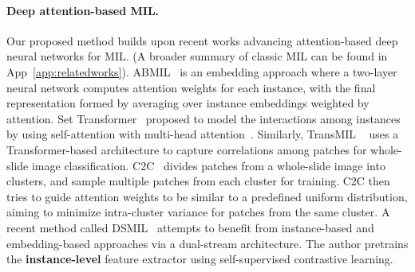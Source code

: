 


\paragraph{Deep attention-based MIL.} 
Our proposed method builds upon recent works advancing attention-based deep neural networks for MIL. (A broader summary of classic MIL can be found in App~\ref{app:relatedworks}).
ABMIL~\citep{ilse2018attention} is an embedding approach where a two-layer neural network computes attention weights for each instance, with the final representation formed by averaging over instance embeddings weighted by attention.
Set Transformer~\citep{lee2019set} proposed to model the interactions among instances by using self-attention with multi-head attention~\citep{vaswani2017attention}. Similarly, TransMIL ~\citep{shao2021transmil} uses a Transformer-based architecture to capture correlations among patches for whole-slide image classification. C2C~\citep{sharma2021cluster} divides patches from a whole-slide image into clusters, and sample multiple patches from each cluster for training. 
C2C then tries to guide attention weights to be similar to a predefined uniform distribution, aiming to minimize intra-cluster variance for patches from the same cluster. A recent method called DSMIL~\citep{li2021dual} attempts to benefit from instance-based and embedding-based approaches via a dual-stream architecture. The author pretrains the \textbf{instance-level} feature extractor using self-supervised contrastive learning.  


